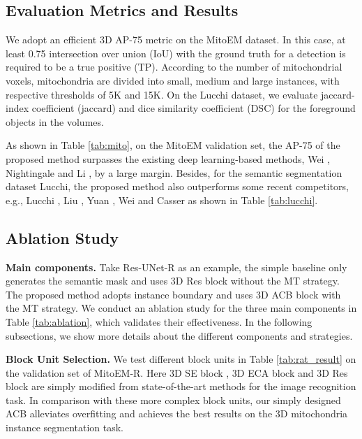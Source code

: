 \documentclass{article}
\begin{document}
\subsection{Evaluation Metrics and Results}
We adopt an efficient 3D AP-75 metric \cite{wei2020mitoem} on the MitoEM dataset. In this case, at least 0.75 intersection over union (IoU) with the ground truth for a detection is required to be a true positive (TP). According to the number of mitochondrial voxels, mitochondria are divided into small, medium and large instances, with respective thresholds of 5K and 15K. On the Lucchi dataset, we evaluate jaccard-index coefficient (jaccard) and  dice similarity coefficient (DSC) for the foreground objects in the volumes.

As shown in Table \ref{tab:mito}, on the MitoEM validation set, the AP-75 of the proposed method surpasses the existing deep learning-based methods, Wei \cite{wei2020mitoem},  Nightingale \cite{nightingale2021automatic} and Li \cite{li2021contrastive}, by a large margin. Besides, for the semantic segmentation dataset Lucchi, the proposed method also outperforms some recent competitors, e.g., Lucchi \cite{lucchi2013learning}, Liu \cite{liu2020automatic}, Yuan \cite{yuan2020net}, Wei \cite{wei2020mitoem} and Casser \cite{casser2020fast} as shown in Table \ref{tab:lucchi}.




\subsection{Ablation Study}
\textbf{Main components.} Take Res-UNet-R as an example, the simple baseline  only generates the semantic mask and uses 3D Res block  without the MT strategy. The proposed method  adopts instance boundary and  uses 3D ACB block  with the MT strategy. We conduct an ablation study for the three main components in Table \ref{tab:ablation}, which validates their effectiveness. 
In the following subsections, we show more details about the different components and strategies.

\textbf{Block Unit Selection.} We test different block units in Table \ref{tab:rat_result} on the validation set of MitoEM-R. Here 3D SE block \cite{hu2018squeeze}, 3D ECA block \cite{wang2020eca} and 3D Res block \cite{he2016deep} are simply modified from state-of-the-art methods for the image recognition task.  In comparison with these more complex block units, our simply designed ACB alleviates overfitting and achieves the best results on the 3D mitochondria instance  segmentation task.
\end{document}
